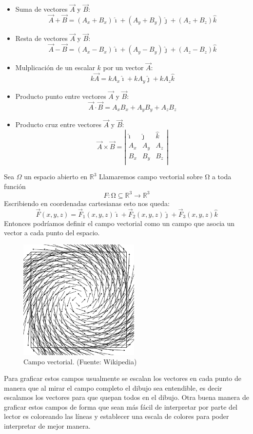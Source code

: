 \documentclass[11pt]{article}
\begin{document}
\begin{itemize}
\item Suma de vectores $\vec{A}$ y $\vec{B}$:
$$\vec{A}+\vec{B}=(A_x+B_x)\hat{\imath}+(A_y+B_y)\hat{\jmath}+(A_z+B_z)\hat{k}$$
\item Resta de vectores $\vec{A}$ y $\vec{B}$:
$$\vec{A}-\vec{B}=(A_x-B_x)\hat{\imath}+(A_y-B_y)\hat{\jmath}+(A_z-B_z)\hat{k}$$
\item Mulplicación de un escalar $k$ por un vector $\vec{A}$:
$$k\vec{A}= kA_x \hat{\imath}+kA_y\hat{\jmath}+kA_z\hat{k}$$
\item Producto punto entre vectores $\vec{A}$ y $\vec{B}$:
$$\vec{A} \cdot \vec{B}= A_xB_x+A_yB_y+A_zB_z$$
\item Producto cruz entre vectores $\vec{A}$ y $\vec{B}$:
$$\vec{A} \times \vec{B}= \left| {\begin{array}{ccc}
   \hat{\imath} & \hat{\jmath} & \hat{k} \\
   A_x & A_y & A_z\\
   B_x & B_y & B_z\\
  \end{array} } \right|$$
\end{itemize}
Sea $\Omega$ un espacio abierto en $\mathbb{R}^3$ 
Llamaremos campo vectorial sobre Ω a toda función $$F : Ω ⊆ \mathbb{R}^3\rightarrow\mathbb{R}^3$$
Escribiendo en coordenadas cartesianas esto nos queda:
$$\vec{F}(x,y,z)=\vec{F}_1(x,y,z)\hat{\imath}+\vec{F}_2(x,y,z)\hat{\jmath}+\vec{F}_3(x,y,z)\hat{k}$$
Entonces podríamos definir el campo vectorial como un campo que asocia un vector a cada punto del espacio.
\begin{figure}[H]
\centering
\includegraphics[height=6cm]{Imagenes/campovec.png}
\caption{Campo vectorial. (Fuente: Wikipedia)}\label{fig:Campo vectorial}
\end{figure}
Para graficar estos campos usualmente se escalan los vectores en cada punto de manera que al mirar el campo completo el dibujo sea entendible, es decir escalamos los vectores para que quepan todos en el dibujo. Otra buena manera de graficar estos campos de forma que sean más fácil de interpretar por parte del lector es coloreando las líneas y establecer una escala de colores para poder interpretar de mejor manera.
\end{document}
